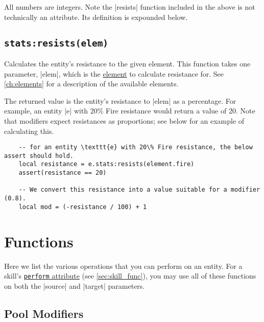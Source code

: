 All numbers are integers.
Note the |resists| function included in the above is not technically an attribute.
Its definition is expounded below.

\subsection{\lstinline{stats:resists(elem)}}
\label{sec:entity_stats_resists}

Calculates the entity's resistance to the given element.
This function takes one parameter, |elem|,
which is the \hyperref[ch:elements]{element} to calculate resistance for.
See \autoref{ch:elements} for a description of the available elements.

The returned value is the entity's resistance to |elem| as a percentage.
For example, an entity |e| with 20\% Fire resistance would return a value
of 20. Note that modifiers expect resistances as proportions; see below for
an example of calculating this.

\begin{lstlisting}
    -- for an entity \texttt{e} with 20\% Fire resistance, the below assert should hold.
    local resistance = e.stats:resists(element.fire)
    assert(resistance == 20)

    -- We convert this resistance into a value suitable for a modifier (0.8).
    local mod = (-resistance / 100) + 1
\end{lstlisting}

\section{Functions}
\label{sec:entity_func}

Here we list the various operations that you can perform on an entity.
For a skill's \hyperref[sec:skill_func]{\lstinline|perform| attribute}
(see \autoref{sec:skill_func}),
you may use all of these functions on both the |source| and |target| parameters.

\subsection{Pool Modifiers}
\label{sec:entity_func_pool}

